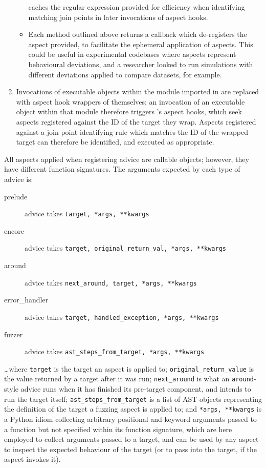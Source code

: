 \begin{enumerate}
\begin{itemize}
        caches the regular expression provided for efficiency when identifying
        matching join points in later invocations of aspect hooks.
        \item Each method outlined above returns a callback which de-registers
        the aspect provided, to facilitate the ephemeral application of aspects.
        This could be useful in experimental codebases where aspects represent
        behavioural deviations, and a researcher looked to run simulations with
        different deviations applied to compare datasets, for example.
    \end{itemize}
    \item Invocations of executable objects within the module imported in
     are replaced with aspect hook wrappers of themselves; an
    invocation of an executable object within that module therefore triggers
    \pdsf{}'s aspect hooks, which seek aspects registered against the ID of the
    target they wrap. Aspects registered against a join point identifying rule
    which matches the ID of the wrapped target can therefore be identified, and
    executed as appropriate.
\end{enumerate}

All aspects applied when registering advice are callable objects; however, they
have different function signatures. The arguments expected by each type of
advice is:

\begin{description}
    \item[prelude] advice takes \lstinline{target, *args, **kwargs}
    \item[encore] advice takes \lstinline{target, original_return_val, *args, **kwargs}
    \item[around] advice takes \lstinline{next_around, target, *args, **kwargs}
    \item[error\_handler] advice takes \lstinline{target, handled_exception, *args, **kwargs}
    \item[fuzzer] advice takes \lstinline{ast_steps_from_target, *args, **kwargs}
\end{description}

\ldots{}where \lstinline{target} is the target an aspect is applied to;
\lstinline{original_return_value} is the value returned by a target after it was
run; \lstinline{next_around} is what an \lstinline{around}-style advice runs
when it has finished its pre-target component, and intends to run the target
itself; \lstinline{ast_steps_from_target} is a list of AST objects representing
the definition of the target a fuzzing aspect is applied to; and
\lstinline{*args, **kwargs} is a Python idiom collecting arbitrary positional
and keyword arguments passed to a function but not specified within its function
signature, which are here employed to collect arguments passed to a target, and
can be used by any aspect to inspect the expected behaviour of the target (or to
pass into the target, if the aspect invokes it).

